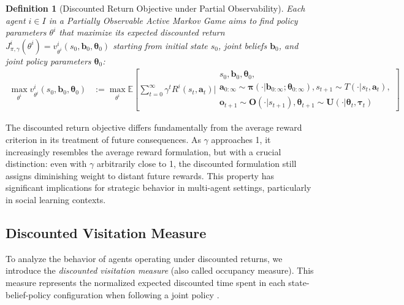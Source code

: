 \documentclass[a4paper,12pt]{report}
\newtheorem{definition}{Definition}
\begin{document}
\begin{definition}[Discounted Return Objective under Partial Observability]
    Each agent $i \in I$ in a Partially Observable Active Markov Game aims to find policy parameters $\theta^i$ that maximize its expected discounted return $J^i_{\pi, \gamma}(\theta^i) = v^i_{\theta^i}(s_0, \boldsymbol{b}_0, \boldsymbol{\theta}_0)$ starting from initial state $s_0$, joint beliefs $\boldsymbol{b}_0$, and joint policy parameters $\boldsymbol{\theta}_0$:
    \begin{align}
        \max_{\theta^i} v^i_{\theta^i}(s_0, \boldsymbol{b}_0, \boldsymbol{\theta}_0) & := \max_{\theta^i} \mathbb{E}\left[ \sum_{t=0}^{\infty} \gamma^t R^i(s_t, \boldsymbol{a}_t) \bigg|
            \begin{array}{c}
                s_0, \boldsymbol{b}_0, \boldsymbol{\theta}_0, \\
                \boldsymbol{a}_{0:\infty} \sim \boldsymbol{\pi}(\cdot|\boldsymbol{b}_{0:\infty}; \boldsymbol{\theta}_{0:\infty}),
                s_{t+1} \sim T(\cdot|s_t, \boldsymbol{a}_t),  \\
                \boldsymbol{o}_{t+1} \sim \boldsymbol{O}(\cdot|s_{t+1}),
                \boldsymbol{\theta}_{t+1} \sim \boldsymbol{U}(\cdot|\boldsymbol{\theta}_t, \boldsymbol{\tau}_t)
            \end{array}
            \right]
    \end{align}

\end{definition}

The discounted return objective differs fundamentally from the average reward criterion in its treatment of future consequences. As $\gamma$ approaches 1, it increasingly resembles the average reward formulation, but with a crucial distinction: even with $\gamma$ arbitrarily close to 1, the discounted formulation still assigns diminishing weight to distant future rewards. This property has significant implications for strategic behavior in multi-agent settings, particularly in social learning contexts.

\subsection{Discounted Visitation Measure}

To analyze the behavior of agents operating under discounted returns, we introduce the \textit{discounted visitation measure} (also called occupancy measure). This measure represents the normalized expected discounted time spent in each state-belief-policy configuration when following a joint policy \citep{sutton1999policy, Silver2014DeterministicPG}.
\end{document}
